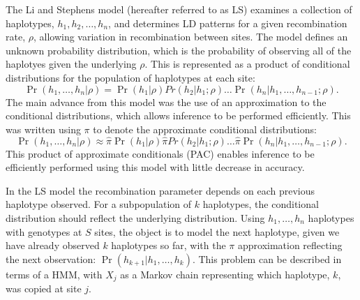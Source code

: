 
The Li and Stephens model (hereafter referred to as LS) examines a collection of haplotypes, $h_1,h_2,\dots,h_n$, and determines LD patterns for a given recombination rate, $\rho$, allowing variation in recombination between sites.
The model defines an unknown probability distribution, which is the probability of observing all of the haplotyes given the underlying $\rho$.
This is represented as a product of conditional distributions for the population of haplotypes at each site:
\begin{equation}
    \Pr(h_1,\dots, h_n | \rho ) = \Pr(h_1 |\rho) Pr(h_2 |h_1; \rho) \dots \Pr(h_n |h_1,\dots, h_{n-1}; \rho) .
\end{equation}
The main advance from this model was the use of an approximation to the conditional distributions, which allows inference to be performed efficiently.
This was written using $\pi$ to denote the approximate conditional distributions:
\begin{equation}
    \Pr(h_1,\dots, h_n | \rho ) \approx \hat{\pi} \Pr(h_1 |\rho) \hat{\pi} Pr(h_2 |h_1; \rho) \dots \hat{\pi} \Pr(h_n |h_1,\dots, h_{n-1}; \rho) .
\end{equation}
This product of approximate conditionals (PAC) enables inference to be efficiently performed using this model with little decrease in accuracy\cite{Li2003}.

In the LS model the recombination parameter depends on each previous haplotype observed.
For a subpopulation of $k$ haplotypes, the conditional distribution should reflect the underlying distribution.
Using $h_1,\dots,h_n$ haplotypes with genotypes at $S$ sites, the object is to model the next haplotype, given we have already observed $k$ haplotypes so far, with the $\pi$ approximation reflecting the next observation:
$ \Pr( h_{k+1} | h_1,\dots,h_k) $.
This problem can be described in terms of a HMM, with $X_j$ as a Markov chain representing which haplotype, $k$, was copied at site $j$.

